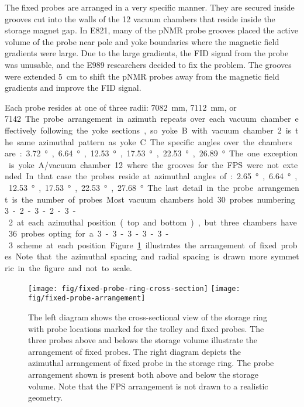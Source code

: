 The fixed probes are arranged in a very specific manner.  They are secured inside grooves cut into the walls of the 12 vacuum chambers that reside inside the storage magnet gap.  In E821, many of the pNMR probe grooves placed the active volume of the probe near pole and yoke boundaries where the magnetic field gradients were large.  Due to the large gradients, the FID signal from the probe was unusable, and the E989 researchers decided to fix the problem.  The grooves were extended \SI{5}{\cm} to shift the pNMR probes away from the magnetic field gradients and improve the FID signal.

Each probe resides at one of three radii: \SI{7082}{\mm}, \SI{7112}{\mm}, or \SI{7142}. The probe arrangement in azimuth repeats over each vacuum chamber effectively following the yoke sections, so yoke B with vacuum chamber 2 is the same azimuthal pattern as yoke C.  The specific angles over the chambers are: \SI{3.72}{\degree}, \SI{6.64}{\degree}, \SI{12.53}{\degree}, \SI{17.53}{\degree}, \SI{22.53}{\degree}, \SI{26.89}{\degree}.  The one exception is yoke A/vacuum chamber 12 where the grooves for the FPS were not extended.  In that case the probes reside at azimuthal angles of: \SI{2.65}{\degree}, \SI{6.64}{\degree}, \SI{12.53}{\degree}, \SI{17.53}{\degree}, \SI{22.53}{\degree}, \SI{27.68}{\degree}.  The last detail in the probe arrangement is the number of probes.  Most vacuum chambers hold 30 probes numbering 3-2-3-2-3-2 at each azimuthal position (top and bottom), but three chambers have 36 probes opting for a 3-3-3-3-3-3 scheme at each position.  Figure \ref{fig:fixed-probe-arrangement} illustrates the arrangement of fixed probes.  Note that the azimuthal spacing and radial spacing is drawn more symmetric in the figure and not to scale.

\begin{figure}
\centering
\texttt{[image: fig/fixed-probe-ring-cross-section]}
\texttt{[image: fig/fixed-probe-arrangement]}
\caption{
    The left diagram shows the cross-sectional view of the storage ring with probe locations marked for the trolley and fixed probes.  The three probes above and belows the storage volume illustrate the arrangement of fixed probes.  The right diagram depicts the azimuthal arrangement of fixed probe in the storage ring. The probe arrangement shown is present both above and below the storage volume. Note that the FPS arrangement is not drawn to a realistic geometry.
    \label{fig:fixed-probe-arrangement}
}
\end{figure}


